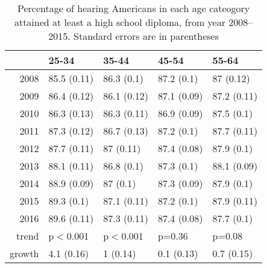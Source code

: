 \documentclass{article}\usepackage[]{graphicx}\usepackage[]{color}
\begin{document}
\begin{table}[ht]
\centering
\begin{tabular}{rllll}
  \hline
 & 25-34 & 35-44 & 45-54 & 55-64 \\
  \hline
2008 & 85.5 (0.11) & 86.3 (0.1) & 87.2 (0.1) & 87 (0.12) \\
  2009 & 86.4 (0.12) & 86.1 (0.12) & 87.1 (0.09) & 87.2 (0.11) \\
  2010 & 86.3 (0.13) & 86.3 (0.11) & 86.9 (0.09) & 87.5 (0.1) \\
  2011 & 87.3 (0.12) & 86.7 (0.13) & 87.2 (0.1) & 87.7 (0.11) \\
  2012 & 87.7 (0.11) & 87 (0.11) & 87.4 (0.08) & 87.9 (0.1) \\
  2013 & 88.1 (0.11) & 86.8 (0.1) & 87.3 (0.1) & 88.1 (0.09) \\
  2014 & 88.9 (0.09) & 87 (0.1) & 87.3 (0.09) & 87.9 (0.1) \\
  2015 & 89.3 (0.1) & 87.1 (0.11) & 87.2 (0.1) & 87.9 (0.11) \\
  2016 & 89.6 (0.11) & 87.3 (0.11) & 87.4 (0.08) & 87.7 (0.1) \\
  trend & p$<$0.001 & p$<$0.001 & p=0.36 & p=0.08 \\
  growth & 4.1 (0.16) & 1 (0.14) & 0.1 (0.13) & 0.7 (0.15) \\
   \hline
\end{tabular}
\caption{Percentage of hearing Americans in each age cateogory attained at least a high school diploma, from year 2008--2015. Standard errors are in parentheses}
\label{tab:hearAgeTime}
\end{table}
\end{document}
